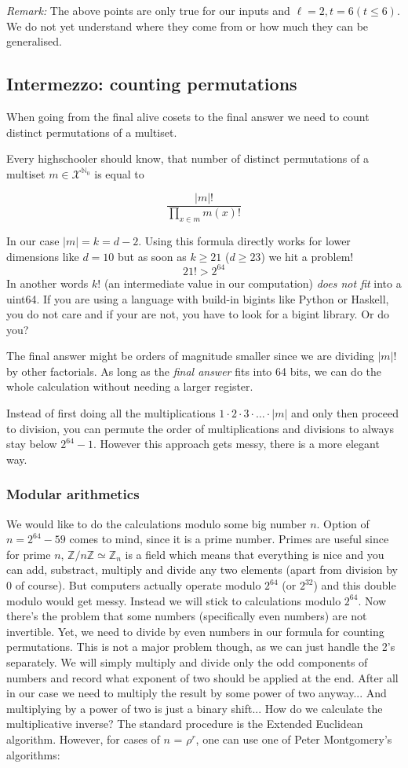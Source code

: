 \documentclass[]{article}
\newcommand{\NN}{\mathbb N}
\newcommand{\ZZ}{\mathbb Z}
\begin{document}
	\emph{Remark:} The above points are only true for our inputs and $\ell=2, t=6 (t \leq 6)$. We do not yet understand where they come from or how much they can be generalised.
	
	\subsection{Intermezzo: counting permutations}
	When going from the final alive cosets to the final answer we need to count distinct permutations of a multiset.
	
	Every highschooler should know, that number of distinct permutations of a multiset $m \in \mathcal X ^{\NN_0}$ is equal to 
	
	$$\frac{|m|!}{\prod_{x\in m} m(x)!}$$
	
	In our case $|m| = k = d-2$.
	Using this formula directly works for lower dimensions like $d=10$ but as soon as $k \geq 21$ ($d \geq 23$) we hit a problem!
	$$21! > 2^{64}$$
	In another words $k!$ (an intermediate value in our computation) \emph{does not fit} into a uint64. If you are using a language with build-in bigints like Python or Haskell, you do not care and if your are not, you have to look for a bigint library. Or do you?
	
	The final answer might be orders of magnitude smaller since we are dividing $|m|!$ by other factorials. As long as the \emph{final answer} fits into 64 bits, we can do the whole calculation without needing a larger register.
	
	Instead of first doing all the multiplications $1 \cdot 2\cdot 3\cdot \dots\cdot |m|$ and only then proceed to division, you can permute the order of multiplications and divisions to always stay below $2^{64}-1$. However this approach gets messy, there is a more elegant way.
	
	\subsubsection{Modular arithmetics}
	We would like to do the calculations modulo some big number $n$. Option of $n=2^{64}-59$ comes to mind, since it is a prime number. Primes are useful since for prime $n$, $\ZZ/n\ZZ \simeq \ZZ_n$ is a field which means that everything is nice and you can add, substract, multiply and divide any two elements (apart from division by 0 of course). But computers actually operate modulo $2^{64}$ (or $2^{32}$) and this double modulo would get messy.
	Instead we will stick to calculations modulo $2^{64}$. Now there's the problem that some numbers (specifically even numbers) are not invertible. Yet, we need to divide by even numbers in our formula for counting permutations. This is not a major problem though, as we can just handle the 2's separately. We will simply multiply and divide only the odd components of numbers and record what exponent of two should be applied at the end. After all in our case  we need to multiply the result by some power of two anyway... And multiplying by a power of two is just a binary shift...
	How do we calculate the multiplicative inverse? The standard procedure is the Extended Euclidean algorithm. However, for cases of $n$ = $\rho^r$, one can use one of Peter Montgomery's algorithms:
	
\end{document}
